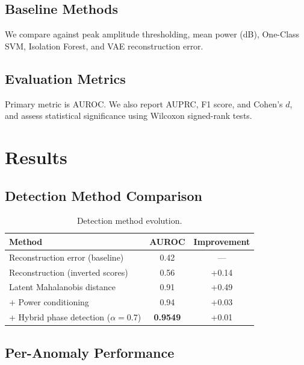 \documentclass[conference]{IEEEtran}
\begin{document}
\subsection{Baseline Methods}
We compare against peak amplitude thresholding, mean power (dB), One-Class SVM, Isolation Forest, and VAE reconstruction error.

\subsection{Evaluation Metrics}
Primary metric is AUROC. We also report AUPRC, F1 score, and Cohen's $d$, and assess statistical significance using Wilcoxon signed-rank tests.

\section{Results}
\subsection{Detection Method Comparison}
\begin{table}[t]
\caption{Detection method evolution.}
\label{tab:evolution}
\centering
\begin{tabular}{@{}lcc@{}}
\toprule
Method & AUROC & Improvement \\
\midrule
Reconstruction error (baseline) & 0.42 & --- \\
Reconstruction (inverted scores) & 0.56 & +0.14 \\
Latent Mahalanobis distance & 0.91 & +0.49 \\
+ Power conditioning & 0.94 & +0.03 \\
+ Hybrid phase detection ($\alpha=0.7$) & \textbf{0.9549} & +0.01 \\
\bottomrule
\end{tabular}
\end{table}

\subsection{Per-Anomaly Performance}
\begin{table}[t]
\caption{Per-anomaly detection performance (hybrid, $\alpha=0.7$).}
\label{tab:peranomaly}
\centering
{}
\end{table}
\end{document}
